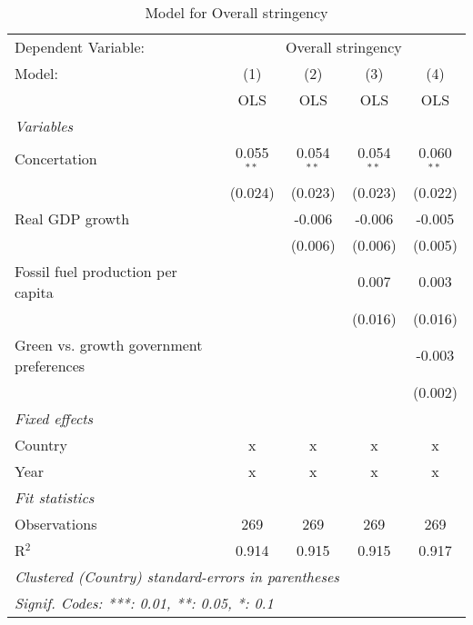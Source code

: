 
\begin{table}[htbp]
   \caption{Model for Overall stringency}
   \centering
   \begin{tabular}{lcccc}
      \toprule
      Dependent Variable: & \multicolumn{4}{c}{Overall stringency}\\
      Model:                                  & (1)          & (2)          & (3)          & (4)\\  
                                              &  OLS         & OLS          & OLS          & OLS\\  
      \midrule
      \emph{Variables}\\
      Concertation                            & 0.055$^{**}$ & 0.054$^{**}$ & 0.054$^{**}$ & 0.060$^{**}$\\   
                                              & (0.024)      & (0.023)      & (0.023)      & (0.022)\\   
      Real GDP growth                         &              & -0.006       & -0.006       & -0.005\\   
                                              &              & (0.006)      & (0.006)      & (0.005)\\   
      Fossil fuel production per capita       &              &              & 0.007        & 0.003\\   
                                              &              &              & (0.016)      & (0.016)\\   
      Green vs. growth government preferences &              &              &              & -0.003\\   
                                              &              &              &              & (0.002)\\   
      \emph{Fixed effects}\\
      Country                                 & x            & x            & x            & x\\  
      Year                                    & x            & x            & x            & x\\  
      \midrule \emph{Fit statistics}\\
      Observations                            & 269          & 269          & 269          & 269\\  
      R$^2$                                   & 0.914        & 0.915        & 0.915        & 0.917\\  
      \midrule
      \multicolumn{5}{l}{\emph{Clustered (Country) standard-errors in parentheses}}\\
      \multicolumn{5}{l}{\emph{Signif. Codes: ***: 0.01, **: 0.05, *: 0.1}}\\
   \end{tabular}
\end{table}


